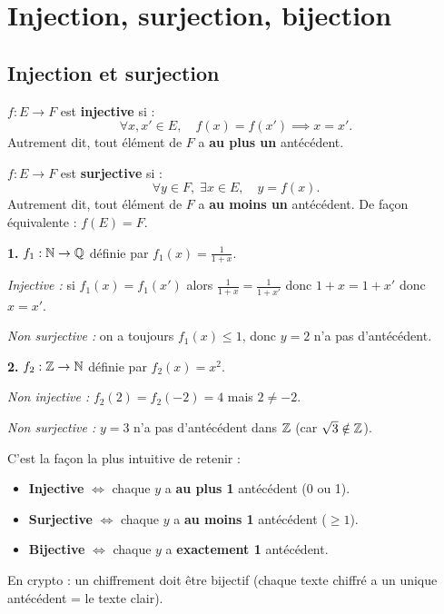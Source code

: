 \section{Injection, surjection, bijection}

\subsection{Injection et surjection}

\begin{defbox}[--- Injection]
$f : E \to F$ est \textbf{injective} si :
\[\forall x, x' \in E, \quad f(x) = f(x') \implies x = x'.\]
Autrement dit, tout élément de $F$ a \textbf{au plus un} antécédent.
\end{defbox}

\begin{defbox}[--- Surjection]
$f : E \to F$ est \textbf{surjective} si :
\[\forall y \in F,\; \exists x \in E, \quad y = f(x).\]
Autrement dit, tout élément de $F$ a \textbf{au moins un} antécédent. De façon équivalente : $f(E) = F$.
\end{defbox}

\begin{exbox}
\textbf{1.} $f_1 : \mathbb{N} \to \mathbb{Q}$ définie par $f_1(x) = \frac{1}{1+x}$.

\emph{Injective :} si $f_1(x) = f_1(x')$ alors $\frac{1}{1+x} = \frac{1}{1+x'}$ donc $1+x = 1+x'$ donc $x = x'$. \checkmark

\emph{Non surjective :} on a toujours $f_1(x) \leqslant 1$, donc $y = 2$ n'a pas d'antécédent.

\medskip
\textbf{2.} $f_2 : \mathbb{Z} \to \mathbb{N}$ définie par $f_2(x) = x^2$.

\emph{Non injective :} $f_2(2) = f_2(-2) = 4$ mais $2 \neq -2$.

\emph{Non surjective :} $y = 3$ n'a pas d'antécédent dans $\mathbb{Z}$ (car $\sqrt{3} \notin \mathbb{Z}$).
\end{exbox}

\begin{intuitionbox}
C'est la façon la plus intuitive de retenir :
\begin{itemize}[leftmargin=1.5cm]
  \item \textbf{Injective} $\iff$ chaque $y$ a \textbf{au plus 1} antécédent (0 ou 1).
  \item \textbf{Surjective} $\iff$ chaque $y$ a \textbf{au moins 1} antécédent ($\geqslant 1$).
  \item \textbf{Bijective} $\iff$ chaque $y$ a \textbf{exactement 1} antécédent.
\end{itemize}
En crypto : un chiffrement doit être bijectif (chaque texte chiffré a un unique antécédent = le texte clair).
\end{intuitionbox}


